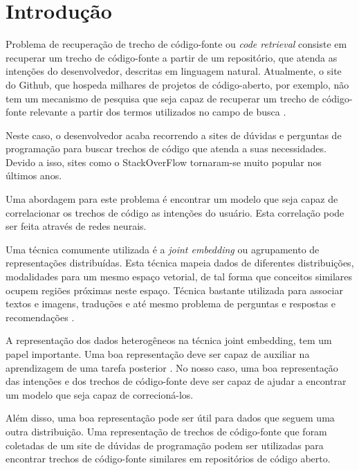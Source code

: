 \chapter{Introdução}
\label{cap:introducao}


Problema de recuperação de trecho de código-fonte ou \textit{code retrieval} consiste em recuperar um trecho de código-fonte a partir de um repositório, que atenda as intenções do desenvolvedor, descritas em linguagem natural. Atualmente, o site do Github, que hospeda milhares de projetos de código-aberto, por exemplo, não tem um mecanismo de pesquisa que
seja capaz de recuperar um trecho de código-fonte relevante a partir dos termos utilizados no campo de busca \citep{cambronero-deep-learning-code-search:2019}.

Neste caso, o desenvolvedor acaba recorrendo a sites de dúvidas e perguntas de programação para buscar trechos de código que atenda a suas necessidades. Devido a isso, sites como o
StackOverFlow tornaram-se muito popular nos últimos anos.


Uma abordagem para este problema é encontrar um \gls{modelo} que seja capaz de correlacionar os trechos de código as intenções do usuário. Esta correlação pode ser feita através de redes neurais. 

Uma técnica comumente utilizada é a \textit{joint embedding} ou agrupamento de representações distribuídas. Esta técnica mapeia dados de diferentes distribuições, modalidades para um mesmo espaço vetorial, de tal forma que conceitos similares ocupem regiões próximas neste espaço. Técnica bastante utilizada para associar textos e imagens, traduções e até mesmo problema de perguntas e respostas e recomendações \citep{lai-etal-2018-review, Zhang:2019:deep-learning-recommender-survey}.

A representação dos dados heterogêneos na técnica joint embedding, tem um papel importante. Uma boa representação deve ser capaz de auxiliar na aprendizagem de uma tarefa
posterior \citep{Goodfellow-et-al-2016:representation-learning}. No nosso caso, uma boa representação das intenções e dos trechos de código-fonte deve ser capaz de ajudar a encontrar um modelo que seja capaz de correcioná-los. 

Além disso, uma boa representação pode ser útil para dados que seguem uma outra distribuição. Uma representação de trechos de código-fonte que foram coletadas de um site de dúvidas de programação podem ser utilizadas para encontrar trechos de código-fonte similares em repositórios de código aberto.

